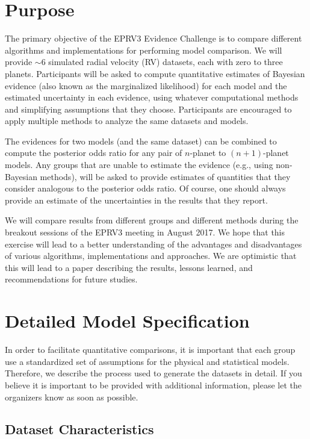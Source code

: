 \documentclass{article}
\begin{document}

\section{Purpose}
The primary objective of the EPRV3 Evidence Challenge is to compare different algorithms and implementations for performing model comparison.  
We will provide $\sim$6 simulated radial velocity (RV) datasets, each with zero to three planets.
Participants will be asked to compute quantitative estimates of Bayesian evidence (also known as the marginalized likelihood) for each model and the estimated uncertainty in each evidence, using whatever computational methods and simplifying assumptions that they choose.
Participants are encouraged to apply multiple methods to analyze the same datasets and models.  

The evidences for two models (and the same dataset) can be combined to compute the posterior odds ratio for any pair of $n$-planet to $(n+1)$-planet models.  
Any groups that are unable to estimate the evidence (e.g., using non-Bayesian methods), will be asked to provide estimates of quantities that they consider analogous to the posterior odds ratio.  
Of course, one should always provide an estimate of the uncertainties in the results that they report.

We will compare results from different groups and different methods during the breakout sessions of the EPRV3 meeting in August 2017.  
We hope that this exercise will lead to a better understanding of the advantages and disadvantages of various algorithms, implementations and approaches.  
We are optimistic that this will lead to a paper describing the results, lessons learned, and recommendations for future studies.

\section{Detailed Model Specification}

In order to facilitate quantitative comparisons, it is important that each group use a standardized set of assumptions for the physical and statistical models.  
Therefore, we describe the process used to generate the datasets in detail. 
If you believe it is important to be provided with additional information, please let the organizers know as soon as possible.

\subsection{Dataset Characteristics}
\end{document}
